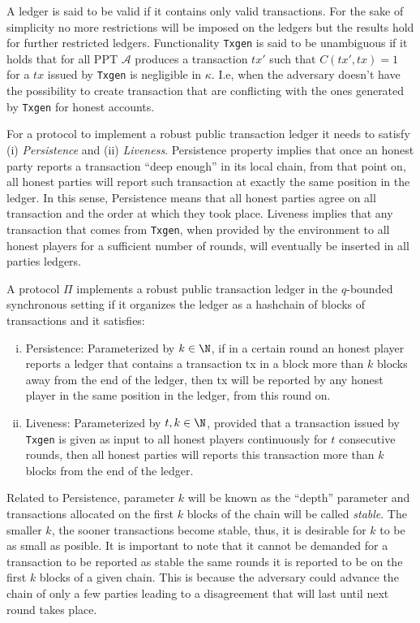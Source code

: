 \documentclass[..]{subfiles}
\begin{document}
A ledger is said to be valid if it contains only valid transactions. For the sake of simplicity no more restrictions will be imposed on the ledgers but the results hold for further restricted ledgers. Functionality \texttt{Txgen} is said to be unambiguous if it holds that for all PPT $\mathcal{A}$ produces a transaction $tx'$ such that $C(tx', tx) = 1$ for a $tx$ issued by \texttt{Txgen} is negligible in $\kappa$. I.e, when the adversary doesn't have the possibility to create transaction that are conflicting with the ones generated by \texttt{Txgen} for honest accounts.

For a protocol to implement a robust public transaction ledger it needs to satisfy (i) \textit{Persistence} and (ii) \textit{Liveness}. Persistence property implies that once an honest party reports a transaction ``deep enough'' in its local chain, from that point on, all honest parties will report such transaction at exactly the same position in the ledger. In this sense, Persistence means that all honest parties agree on all transaction and the order at which they took place. Liveness implies that any transaction that comes from \texttt{Txgen}, when provided by the environment to all honest players for a sufficient number of rounds, will eventually be inserted in all parties ledgers.

\begin{definition}
	A protocol $\Pi$ implements a robust public transaction ledger in the $q$-bounded synchronous setting if it organizes the ledger as a hashchain of blocks of transactions and it satisfies:
	\begin{enumerate}[(i)]
		\item Persistence: Parameterized by $k \in \N$, if in a certain round an honest player reports a ledger that contains a transaction tx in a block more than $k$ blocks away from the end of the ledger, then tx will be reported by any honest player in the same position in the ledger, from this round on.
		\item Liveness: Parameterized by $t, k \in \N$, provided that a transaction issued by \texttt{Txgen} is given as input to all honest players continuously for $t$ consecutive rounds, then all honest parties will reports this transaction more than $k$ blocks from the end of the ledger.
	\end{enumerate}
\end{definition}

Related to Persistence, parameter $k$ will be known as the ``depth'' parameter and transactions allocated on the first $k$ blocks of the chain will be called \textit{stable}. The smaller $k$, the sooner transactions become stable, thus, it is desirable for $k$ to be as small as posible. It is important to note that it cannot be demanded for a transaction to be reported as stable the same rounds it is reported to be on the first $k$ blocks of a given chain. This is because the adversary could advance the chain of only a few parties leading to a disagreement that will last until next round takes place.
\end{document}
